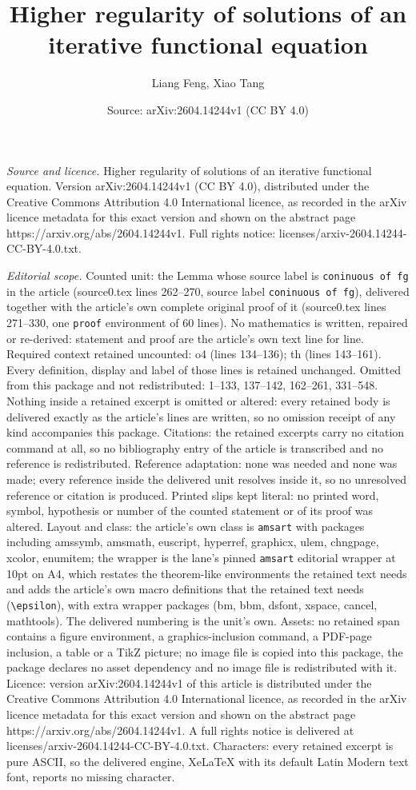 \documentclass[10pt,a4paper]{amsart}
\title[Higher regularity of solutions of an iterative functional eq]{Higher regularity of solutions of an iterative functional equation}
\author{Liang Feng, Xiao Tang}
\date{Source: arXiv:2604.14244v1 (CC BY 4.0)}
\begin{document}
\maketitle

\noindent\emph{Source and licence.} Higher regularity of solutions of an iterative functional equation. Version arXiv:2604.14244v1 (CC BY 4.0), distributed under the Creative Commons Attribution 4.0 International licence, as recorded in the arXiv licence metadata for this exact version and shown on the abstract page https://arxiv.org/abs/2604.14244v1. Full rights notice: licenses/arxiv-2604.14244-CC-BY-4.0.txt.\par\smallskip

\noindent\textit{Editorial scope.} Counted unit: the Lemma whose source label is \texttt{coninuous of fg} in the article (source0.tex lines 262--270, source label \texttt{coninuous of fg}), delivered together with the article's own complete original proof of it (source0.tex lines 271--330, one \texttt{proof} environment of 60 lines). No mathematics is written, repaired or re-derived: statement and proof are the article's own text line for line. Required context retained uncounted: o4 (lines 134--136); th (lines 143--161). Every definition, display and label of those lines is retained unchanged. Omitted from this package and not redistributed: 1--133, 137--142, 162--261, 331--548. Nothing inside a retained excerpt is omitted or altered: every retained body is delivered exactly as the article's lines are written, so no omission receipt of any kind accompanies this package. Citations: the retained excerpts carry no citation command at all, so no bibliography entry of the article is transcribed and no reference is redistributed. Reference adaptation: none was needed and none was made; every reference inside the delivered unit resolves inside it, so no unresolved reference or citation is produced. Printed slips kept literal: no printed word, symbol, hypothesis or number of the counted statement or of its proof was altered. Layout and class: the article's own class is \texttt{amsart} with packages including amssymb, amsmath, euscript, hyperref, graphicx, ulem, chngpage, xcolor, enumitem; the wrapper is the lane's pinned \texttt{amsart} editorial wrapper at 10pt on A4, which restates the theorem-like environments the retained text needs and adds the article's own macro definitions that the retained text needs (\texttt{\textbackslash epsilon}), with extra wrapper packages (bm, bbm, dsfont, xspace, cancel, mathtools). The delivered numbering is the unit's own. Assets: no retained span contains a figure environment, a graphics-inclusion command, a PDF-page inclusion, a table or a TikZ picture; no image file is copied into this package, the package declares no asset dependency and no image file is redistributed with it. Licence: version arXiv:2604.14244v1 of this article is distributed under the Creative Commons Attribution 4.0 International licence, as recorded in the arXiv licence metadata for this exact version and shown on the abstract page https://arxiv.org/abs/2604.14244v1. A full rights notice is delivered at licenses/arxiv-2604.14244-CC-BY-4.0.txt. Characters: every retained excerpt is pure ASCII, so the delivered engine, XeLaTeX with its default Latin Modern text font, reports no missing character.
\end{document}

